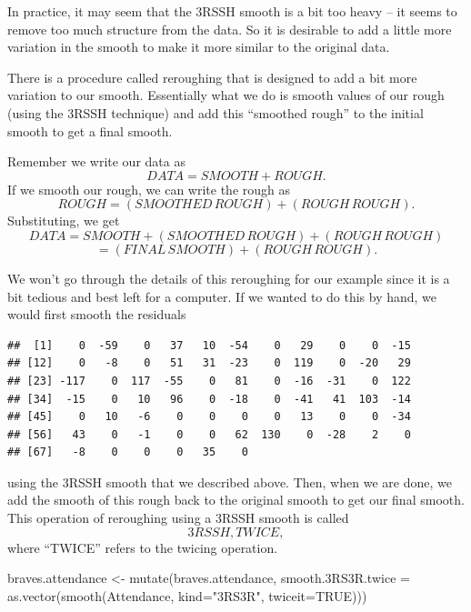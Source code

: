 \documentclass[
]{book}
\newenvironment{Shaded}{\begin{snugshade}}{\end{snugshade}}
\newcommand{\AttributeTok}[1]{\textcolor[rgb]{0.77,0.63,0.00}{#1}}
\newcommand{\ConstantTok}[1]{\textcolor[rgb]{0.00,0.00,0.00}{#1}}
\newcommand{\DecValTok}[1]{\textcolor[rgb]{0.00,0.00,0.81}{#1}}
\newcommand{\FunctionTok}[1]{\textcolor[rgb]{0.00,0.00,0.00}{#1}}
\newcommand{\NormalTok}[1]{#1}
\newcommand{\OtherTok}[1]{\textcolor[rgb]{0.56,0.35,0.01}{#1}}
\newcommand{\SpecialCharTok}[1]{\textcolor[rgb]{0.00,0.00,0.00}{#1}}
\newcommand{\StringTok}[1]{\textcolor[rgb]{0.31,0.60,0.02}{#1}}
\begin{document}
In practice, it may seem that the 3RSSH smooth is a bit too heavy -- it seems to remove too much structure from the data. So it is desirable to add a little more variation in the smooth to make it more similar to the original data.

There is a procedure called reroughing that is designed to add a bit more variation to our smooth. Essentially what we do is smooth values of our rough (using the 3RSSH technique) and add this ``smoothed rough'' to the initial smooth to get a final smooth.

Remember we write our data as
\[
DATA = SMOOTH + ROUGH .
\]
If we smooth our rough, we can write the rough as
\[
ROUGH = (SMOOTHED \, ROUGH) + (ROUGH \, ROUGH) .
\]
Substituting, we get
\[
DATA = SMOOTH + (SMOOTHED \, ROUGH) + (ROUGH \, ROUGH)
\]
\[
            = (FINAL \, SMOOTH) +  (ROUGH \, ROUGH) .
\]

We won't go through the details of this reroughing for our example since it is a bit tedious and best left for a computer. If we wanted to do this by hand, we would first smooth the residuals

\begin{Shaded}
\end{Shaded}

\begin{verbatim}
##  [1]    0  -59    0   37   10  -54    0   29    0    0  -15
## [12]    0   -8    0   51   31  -23    0  119    0  -20   29
## [23] -117    0  117  -55    0   81    0  -16  -31    0  122
## [34]  -15    0   10   96    0  -18    0  -41   41  103  -14
## [45]    0   10   -6    0    0    0    0   13    0    0  -34
## [56]   43    0   -1    0    0   62  130    0  -28    2    0
## [67]   -8    0    0    0   35    0
\end{verbatim}

using the 3RSSH smooth that we described above. Then, when we are done, we add the smooth of this rough back to the original smooth to get our final smooth. This operation of reroughing using a 3RSSH smooth is called
\[
3RSSH, TWICE,
\]
where ``TWICE'' refers to the twicing operation.

\begin{Shaded}
\begin{Highlighting}[]
\NormalTok{braves.attendance }\OtherTok{\textless{}{-}} \FunctionTok{mutate}\NormalTok{(braves.attendance,}
                            \AttributeTok{smooth.3RS3R.twice =} \FunctionTok{as.vector}\NormalTok{(}\FunctionTok{smooth}\NormalTok{(Attendance, }\AttributeTok{kind=}\StringTok{"3RS3R"}\NormalTok{,  }\AttributeTok{twiceit=}\ConstantTok{TRUE}\NormalTok{)))}
\end{Highlighting}
\end{Shaded}
\end{document}
